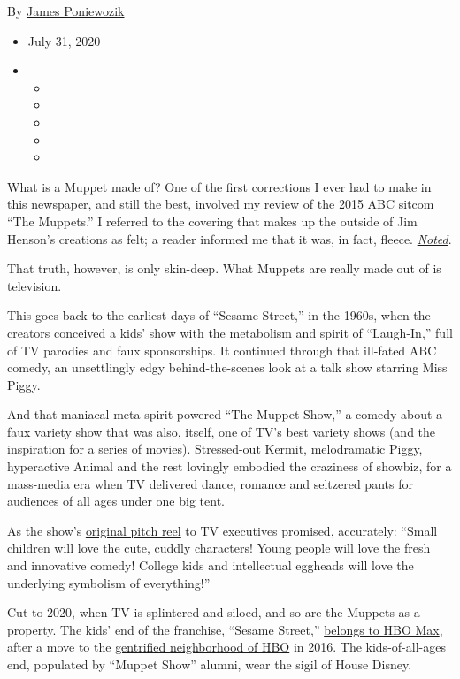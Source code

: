 By \href{https://www.nytimes3xbfgragh.onion/by/james-poniewozik}{James
Poniewozik}

\begin{itemize}
\item
  July 31, 2020
\item
  \begin{itemize}
  \item
  \item
  \item
  \item
  \item
  \end{itemize}
\end{itemize}

What is a Muppet made of? One of the first corrections I ever had to
make in this newspaper, and still the best, involved my review of the
2015 ABC sitcom ``The Muppets.'' I referred to the covering that makes
up the outside of Jim Henson's creations as felt; a reader informed me
that it was, in fact, fleece.
\href{https://www.nytimes3xbfgragh.onion/2015/09/22/arts/television/review-muppets-abc-kermit-ms-piggy.html}{\emph{Noted}}.

That truth, however, is only skin-deep. What Muppets are really made out
of is television.

This goes back to the earliest days of ``Sesame Street,'' in the 1960s,
when the creators conceived a kids' show with the metabolism and spirit
of ``Laugh-In,'' full of TV parodies and faux sponsorships. It continued
through that ill-fated ABC comedy, an unsettlingly edgy
behind-the-scenes look at a talk show starring Miss Piggy.

And that maniacal meta spirit powered ``The Muppet Show,'' a comedy
about a faux variety show that was also, itself, one of TV's best
variety shows (and the inspiration for a series of movies). Stressed-out
Kermit, melodramatic Piggy, hyperactive Animal and the rest lovingly
embodied the craziness of showbiz, for a mass-media era when TV
delivered dance, romance and seltzered pants for audiences of all ages
under one big tent.

As the show's
\href{https://www.youtube.com/watch?v=9KorhvVQRUM}{original pitch reel}
to TV executives promised, accurately: ``Small children will love the
cute, cuddly characters! Young people will love the fresh and innovative
comedy! College kids and intellectual eggheads will love the underlying
symbolism of everything!''

Cut to 2020, when TV is splintered and siloed, and so are the Muppets as
a property. The kids' end of the franchise, ``Sesame Street,''
\href{https://www.nytimes3xbfgragh.onion/2019/10/03/business/media/sesame-street-hbo-max.html}{belongs
to HBO Max}, after a move to the
\href{https://www.nytimes3xbfgragh.onion/2016/01/15/arts/television/tv-review-sesame-street-hbo.html}{gentrified
neighborhood of HBO} in 2016. The kids-of-all-ages end, populated by
``Muppet Show'' alumni, wear the sigil of House Disney.

